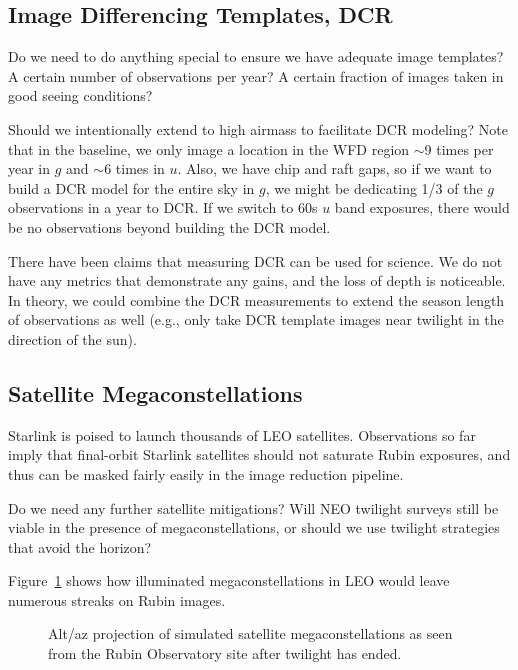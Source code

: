 \subsection{Image Differencing Templates, DCR}

Do we need to do anything special to ensure we have adequate image templates? A certain number of observations per year? A certain fraction of images taken in good seeing conditions?

Should we intentionally extend to high airmass to facilitate DCR modeling? Note that in the baseline, we only image a location in the WFD region $\sim$9 times per year in $g$ and $\sim$6 times in $u$. Also, we have chip and raft gaps, so if we want to build a DCR model for the entire sky in $g$, we might be dedicating 1/3 of the $g$ observations in a year to DCR. If we switch to 60s $u$ band exposures, there would be no observations beyond building the DCR model. 

There have been claims that measuring DCR can be used for science.  We do not have any metrics that demonstrate any gains, and the loss of depth is noticeable. In theory, we could combine the DCR measurements to extend the season length of observations as well (e.g., only take DCR template images near twilight in the direction of the sun).

\subsection{Satellite Megaconstellations}

Starlink is poised to launch thousands of LEO satellites. Observations so far imply that final-orbit Starlink satellites should not saturate Rubin exposures, and thus can be masked fairly easily in the image reduction pipeline. 

Do we need any further satellite mitigations? Will NEO twilight surveys still be viable in the presence of megaconstellations, or should we use twilight strategies that avoid the horizon?

Figure~\ref{fig:megasat} shows how illuminated megaconstellations in LEO would leave numerous streaks on Rubin images.

\begin{figure}
\caption{Alt/az projection of simulated satellite megaconstellations as seen from the Rubin Observatory site after twilight has ended. } \label{fig:megasat}
\end{figure}

